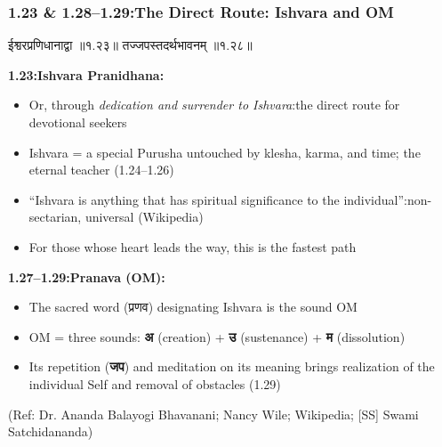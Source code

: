 \begin{frame}[fragile]\frametitle{1.23 \& 1.28–1.29:The Direct Route: Ishvara and OM}

\begin{sanskrit}
ईश्वरप्रणिधानाद्वा ॥१.२३॥
तज्जपस्तदर्थभावनम् ॥१.२८॥
\end{sanskrit}

\textbf{1.23:Ishvara Pranidhana:}
\begin{itemize}
\item Or, through \emph{dedication and surrender to Ishvara}:the direct route for devotional seekers
\item Ishvara = a special Purusha untouched by klesha, karma, and time; the eternal teacher (1.24–1.26)
\item ``Ishvara is anything that has spiritual significance to the individual'':non-sectarian, universal (Wikipedia)
\item For those whose heart leads the way, this is the fastest path
\end{itemize}

\textbf{1.27–1.29:Pranava (OM):}
\begin{itemize}
\item The sacred word (प्रणव) designating Ishvara is the sound OM
\item OM = three sounds: \textbf{अ} (creation) + \textbf{उ} (sustenance) + \textbf{म} (dissolution)
\item Its repetition (\textbf{जप}) and meditation on its meaning brings realization of the individual Self and removal of obstacles (1.29)
\end{itemize}

\tiny{(Ref: Dr. Ananda Balayogi Bhavanani; Nancy Wile; Wikipedia; [SS] Swami Satchidananda)}

\end{frame}


